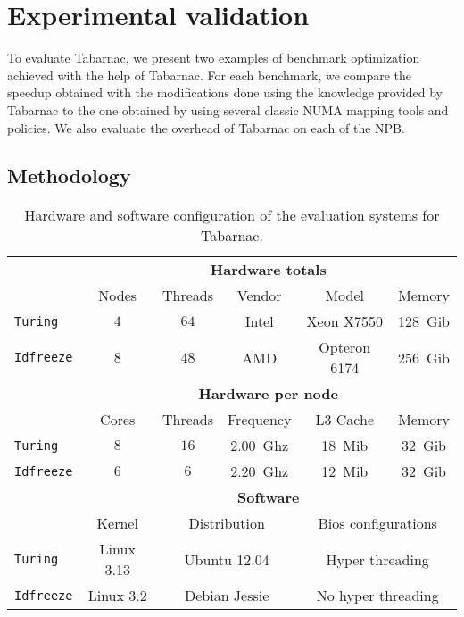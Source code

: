 \section{Experimental validation}
\label{sec:tab-expe}

To evaluate \gls{Tabarnac}, we present two examples of benchmark optimization achieved with the help of \gls{Tabarnac}.
For each benchmark, we compare the speedup obtained with the modifications done using the knowledge provided by \gls{Tabarnac} to the one obtained by using several classic \gls{NUMA} mapping tools and policies.
We also evaluate the overhead of \gls{Tabarnac} on each of the \gls{NPB}.

\subsection{Methodology}


\begin{table}[htb]
    \centering
    \begin{tabular}{lccccc}
        \toprule
        & \multicolumn{5}{c}{\textbf{Hardware totals}}\\
        \cmidrule(lr){2-6}
        & Nodes & Threads & Vendor & Model & Memory \\
        \cmidrule(lr){2-6}
        \texttt{Turing}   & $4$ & $64$ & Intel & Xeon X7550   & \SI{128}{Gib} \\
        \texttt{Idfreeze} & $8$ & $48$ & AMD   & Opteron 6174 & \SI{256}{Gib}\\
        \midrule
        & \multicolumn{5}{c}{\textbf{Hardware per node}}\\
        \cmidrule(lr){2-6}
        & Cores & Threads & Frequency & L3 Cache & Memory \\
        \cmidrule(lr){2-6}
        \texttt{Turing}   & $8$ & $16$ & \SI{2.00}{Ghz}& \SI{18}{Mib} & \SI{32}{Gib} \\
        \texttt{Idfreeze} & $6$ & $6$  & \SI{2.20}{Ghz}& \SI{12}{Mib} & \SI{32}{Gib}\\
        \midrule
        & \multicolumn{5}{c}{\textbf{Software}}\\
        \cmidrule(lr){2-6}
        & Kernel & \multicolumn{2}{c}{Distribution} &
            \multicolumn{2}{c}{Bios configurations} \\
        \cmidrule(lr){2-6}
        \texttt{Turing}   & Linux 3.13 & \multicolumn{2}{c}{Ubuntu 12.04} &
            \multicolumn{2}{c}{Hyper threading} \\
        \texttt{Idfreeze} & Linux 3.2 & \multicolumn{2}{c}{Debian Jessie} &
            \multicolumn{2}{c}{No hyper threading}\\
        \bottomrule
    \end{tabular}
    \caption{Hardware and software configuration of the evaluation systems for Tabarnac.}
    \label{tab:turing-hw}
\end{table}

